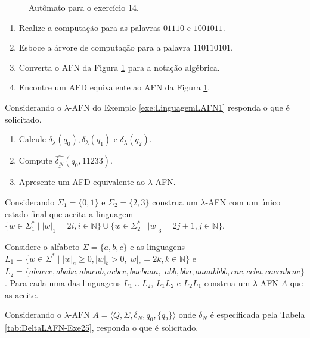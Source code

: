 \begin{problemset}
\begin{figure}[h]
\begin{tikzpicture}[>=stealth, shorten >=1pt, node distance=3.0cm, on grid, auto, state/.append style={minimum size=3em}, thick ]
		\end{tikzpicture}
		\caption{Autômato para o exercício 14.}
		\label{fig:AutomaExercicioLR21}
	\end{figure}
	\begin{enumerate}
		\item Realize a computação para as palavras $01110$ e $1001011$.
		\item Esboce a árvore de computação para a palavra $110110101$.
		\item Converta o AFN da Figura \ref{fig:AutomaExercicioLR21} para a notação algébrica.
		\item Encontre um AFD equivalente ao AFN da Figura \ref{fig:AutomaExercicioLR21}.
	\end{enumerate}

	\item Considerando o $\lambda$-AFN do Exemplo \ref{exe:LinguagemLAFN1} responda o que é solicitado. 
	\begin{enumerate}
		\item Calcule $\delta_\lambda(q_0), \delta_\lambda(q_1)$ e $\delta_\lambda(q_2)$.
		\item Compute $\widehat{\underline{\delta_N}}(q_0, 11233)$.
		\item Apresente um AFD equivalente ao $\lambda$-AFN.
	\end{enumerate}

	\item Considerando $\Sigma_1 = \{0, 1\}$  e $\Sigma_2 = \{2, 3\}$ construa um $\lambda$-AFN com um único estado final que aceita a linguagem $\{w \in \Sigma_1^* \mid |w|_1 = 2i, i \in \mathbb{N}\} \cup \{w \in \Sigma_2^* \mid |w|_3 = 2j + 1, j\in \mathbb{N}\}$.
	
	\item Considere o alfabeto $\Sigma = \{a, b, c\}$ e as linguagens  $L_1 = \{w \in \Sigma^* \mid |w|_a \geq 0, |w|_b > 0, |w|_c = 2k, k \in \mathbb{N}\}$ e $L_2 = \{abaccc, ababc, abacab, acbcc, bacbaaa,$ $abb, bba, aaaabbbb, cac, ccba, caccabcac\}$. Para cada uma das linguagens $L_1 \cup L_2$, $L_1L_2$ e $L_2L_1$ construa um $\lambda$-AFN $A$ que as aceite.
	
	\item Considerando o $\lambda$-AFN $A = \langle Q, \Sigma, \underline{\delta_N}, q_0, \{q_2\} \rangle$ onde $\underline{\delta_N}$ é especificada pela Tabela \ref{tab:DeltaLAFN-Exe25}, responda o que é solicitado.
	

\end{problemset}
